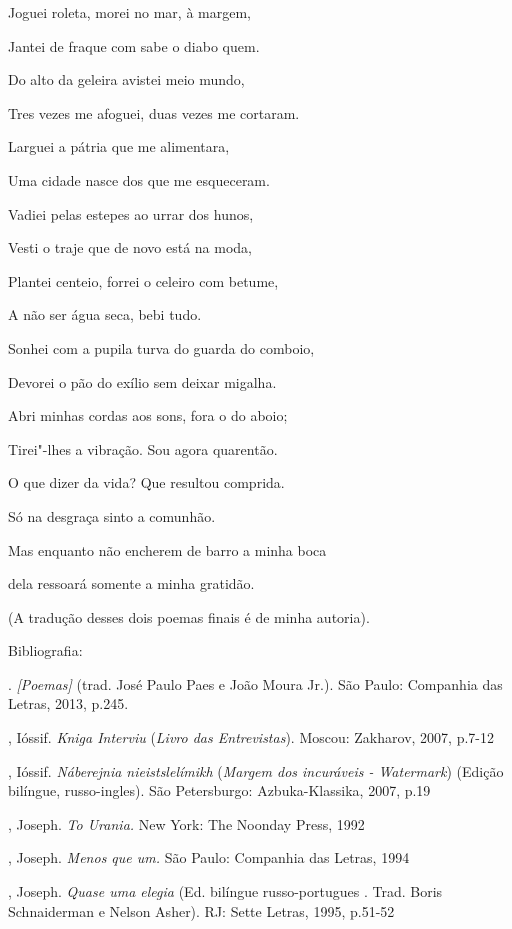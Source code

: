 Joguei roleta, morei no mar, à margem,

Jantei de fraque com sabe o diabo quem.

Do alto da geleira avistei meio mundo,

Tres vezes me afoguei, duas vezes me cortaram.

Larguei a pátria que me alimentara,

Uma cidade nasce dos que me esqueceram.

Vadiei pelas estepes ao urrar dos hunos,

Vesti o traje que de novo está na moda,

Plantei centeio, forrei o celeiro com betume,

A não ser água seca, bebi tudo.

Sonhei com a pupila turva do guarda do comboio,

Devorei o pão do exílio sem deixar migalha.

Abri minhas cordas aos sons, fora o do aboio;

Tirei"-lhes a vibração. Sou agora quarentão.

O que dizer da vida? Que resultou comprida.

Só na desgraça sinto a comunhão.

Mas enquanto não encherem de barro a minha boca

dela ressoará somente a minha gratidão.

(A tradução desses dois poemas finais é de minha autoria).

Bibliografia:

. \emph{ [Poemas]} (trad. José Paulo Paes e
João Moura Jr.). São Paulo: Companhia das Letras, 2013, p.245.

, Ióssif. \emph{Kniga Interviu} (\emph{Livro das Entrevistas}).
Moscou: Zakharov, 2007, p.7-12

, Ióssif. \emph{Náberejnia nieistslelímikh} (\emph{Margem dos
incuráveis - Watermark}) (Edição bilíngue, russo-ingles). São
Petersburgo: Azbuka-Klassika, 2007, p.19

, Joseph. \emph{To Urania.} New York: The Noonday Press, 1992

, Joseph. \emph{Menos que um.} São Paulo: Companhia das Letras,
1994

, Joseph. \emph{Quase uma elegia} (Ed. bilíngue russo-portugues
. Trad. Boris Schnaiderman e Nelson Asher). RJ: Sette Letras, 1995,
p.51-52

